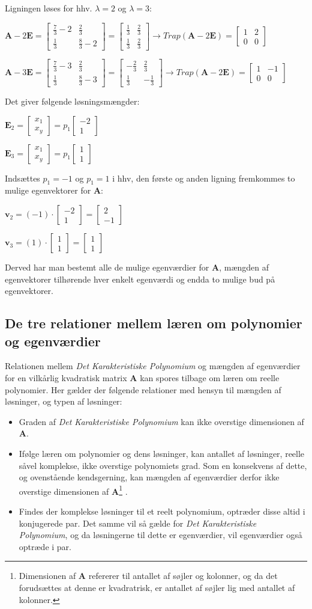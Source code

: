 \documentclass{article}
\newcommand{\cent}[1]{\begin{center}#1\end{center}}
\newcommand{\vekt}[2]{\ensuremath{\begin{bmatrix} #1\\ #2\end{bmatrix}}}
\newcommand{\smallMatrix}[4]{\ensuremath{\begin{bmatrix}
			#1 & #2 \\
			#3 & #4
\end{bmatrix}}}
\begin{document}
	Ligningen løses for hhv. $\lambda=2$ og $\lambda=3$:
	
	\cent{$ \textbf{A}-2\textbf{E}=\smallMatrix{\frac{7}{3}-2}{\frac{2}{3}}{\frac{1}{3}}{\frac{8}{3}-2} = \smallMatrix{\frac{1}{3}}{\frac{2}{3}}{\frac{1}{3}}{\frac{2}{3}} \rightarrow Trap(\textbf{A}-2\textbf{E})=\smallMatrix{1}{2}{0}{0} $}
	
	\cent{$ \textbf{A}-3\textbf{E}=\smallMatrix{\frac{7}{3}-3}{\frac{2}{3}}{\frac{1}{3}}{\frac{8}{3}-3} = \smallMatrix{-\frac{2}{3}}{\frac{2}{3}}{\frac{1}{3}}{-\frac{1}{3}} \rightarrow Trap(\textbf{A}-2\textbf{E})=\smallMatrix{1}{-1}{0}{0} $}
	
	
	Det giver følgende løsningsmængder:
	
	\cent{$ \textbf{E}_2 = \vekt{x_1}{x_y} = p_1 \vekt{-2}{1} $}
	\cent{$ \textbf{E}_3 = \vekt{x_1}{x_y} = p_1 \vekt{1}{1} $}
	
	Indsættes $ p_1 = -1 $ og $ p_1=1 $ i hhv, den første og anden ligning fremkommes to mulige egenvektorer for \textbf{A}:
	
	\cent{$ \textbf{v}_2 = (-1) \cdot \vekt{-2}{1} = \vekt{2}{-1} $}
	\cent{$ \textbf{v}_3 = (1) \cdot \vekt{1}{1} = \vekt{1}{1} $}
	
	Derved har man bestemt alle de mulige egenværdier for \textbf{A}, mængden af egenvektorer tilhørende hver enkelt egenværdi og endda to mulige bud på egenvektorer.
	
	\subsection{De tre relationer mellem læren om polynomier og egenværdier}
	
	Relationen mellem \textit{Det Karakteristiske Polynomium} og mængden af egenværdier for en vilkårlig kvadratisk matrix \textbf{A} kan spores tilbage om læren om reelle polynomier. Her gælder der følgende relationer med hensyn til mængden af løsninger, og typen af løsninger:
	\begin{itemize}
		\item Graden af \textit{Det Karakteristiske Polynomium} kan ikke overstige dimensionen af \textbf{A}.
		\item Ifølge læren om polynomier og dens løsninger, kan antallet af løsninger, reelle såvel komplekse, ikke overstige polynomiets grad. Som en konsekvens af dette, og ovenstående kendsgerning, kan mængden af egenværdier derfor ikke overstige dimensionen af \textbf{A}\footnote{Dimensionen af \textbf{A} refererer til antallet af søjler og kolonner, og da det forudsættes at denne er kvadratrisk, er antallet af søjler lig med antallet af kolonner.} .
		\item Findes der komplekse løsninger til et reelt polynomium, optræder disse altid i konjugerede par. Det samme vil så gælde for \textit{Det Karakteristiske Polynomium}, og da løsningerne til dette er egenværdier, vil egenværdier også optræde i par.
	\end{itemize}
	
	
\end{document}
